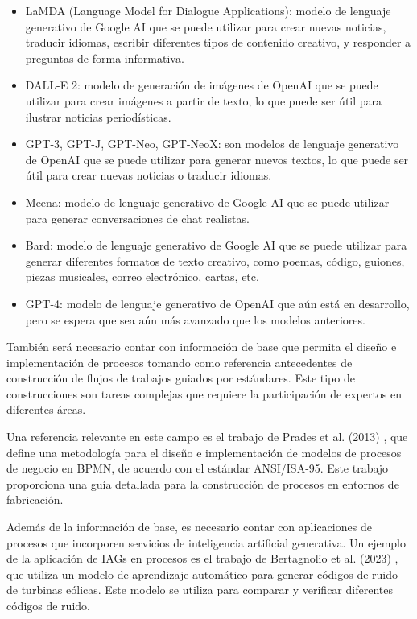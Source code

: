 \documentclass[12pt]{article}
\begin{document}
\begin{itemize}
    \item LaMDA (Language Model for Dialogue Applications): modelo de lenguaje generativo de Google AI que se puede utilizar para crear nuevas noticias, traducir idiomas, escribir diferentes tipos de contenido creativo, y responder a preguntas de forma informativa.
    \item DALL-E 2: modelo de generación de imágenes de OpenAI que se puede utilizar para crear imágenes a partir de texto, lo que puede ser útil para ilustrar noticias periodísticas.
    \item GPT-3, GPT-J, GPT-Neo, GPT-NeoX: son modelos de lenguaje generativo de OpenAI que se puede utilizar para generar nuevos textos, lo que puede ser útil para crear nuevas noticias o traducir idiomas.
    \item Meena: modelo de lenguaje generativo de Google AI que se puede utilizar para generar conversaciones de chat realistas.
    \item Bard: modelo de lenguaje generativo de Google AI que se puede utilizar para generar diferentes formatos de texto creativo, como poemas, código, guiones, piezas musicales, correo electrónico, cartas, etc.
    \item GPT-4: modelo de lenguaje generativo de OpenAI que aún está en desarrollo, pero se espera que sea aún más avanzado que los modelos anteriores. 
\end{itemize}

También será necesario contar con información de base que permita el diseño e implementación de procesos tomando como referencia antecedentes de construcción de flujos de trabajos guiados por estándares. Este tipo de construcciones son tareas complejas que requiere la participación de expertos en diferentes áreas. 

Una referencia relevante en este campo es el trabajo de Prades et al. (2013) \cite{PRADES2013115}, que define una metodología para el diseño e implementación de modelos de procesos de negocio en BPMN, de acuerdo con el estándar ANSI/ISA-95. Este trabajo proporciona una guía detallada para la construcción de procesos en entornos de fabricación.

Además de la información de base, es necesario contar con aplicaciones de procesos que incorporen servicios de inteligencia artificial generativa. Un ejemplo de la aplicación de IAGs en procesos es el trabajo de Bertagnolio et al. (2023) \cite{bertagnolio2023}, que utiliza un modelo de aprendizaje automático para generar códigos de ruido de turbinas eólicas. Este modelo se utiliza para comparar y verificar diferentes códigos de ruido.
\end{document}

